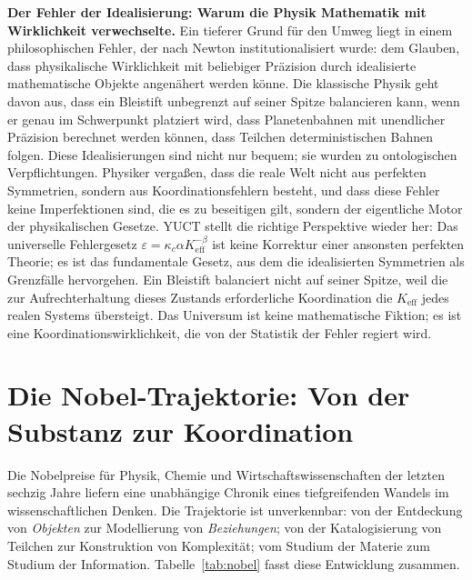 \documentclass[12pt,a4paper]{article}
\begin{document}
	\textbf{Der Fehler der Idealisierung: Warum die Physik Mathematik mit Wirklichkeit verwechselte.} Ein tieferer Grund für den Umweg liegt in einem philosophischen Fehler, der nach Newton institutionalisiert wurde: dem Glauben, dass physikalische Wirklichkeit mit beliebiger Präzision durch idealisierte mathematische Objekte angenähert werden könne. Die klassische Physik geht davon aus, dass ein Bleistift unbegrenzt auf seiner Spitze balancieren kann, wenn er genau im Schwerpunkt platziert wird, dass Planetenbahnen mit unendlicher Präzision berechnet werden können, dass Teilchen deterministischen Bahnen folgen. Diese Idealisierungen sind nicht nur bequem; sie wurden zu ontologischen Verpflichtungen. Physiker vergaßen, dass die reale Welt nicht aus perfekten Symmetrien, sondern aus Koordinationsfehlern besteht, und dass diese Fehler keine Imperfektionen sind, die es zu beseitigen gilt, sondern der eigentliche Motor der physikalischen Gesetze. YUCT stellt die richtige Perspektive wieder her: Das universelle Fehlergesetz \(\varepsilon = \kappa_c \alpha K_{\mathrm{eff}}^{-\beta}\) ist keine Korrektur einer ansonsten perfekten Theorie; es ist das fundamentale Gesetz, aus dem die idealisierten Symmetrien als Grenzfälle hervorgehen. Ein Bleistift balanciert nicht auf seiner Spitze, weil die zur Aufrechterhaltung dieses Zustands erforderliche Koordination die \(K_{\mathrm{eff}}\) jedes realen Systems übersteigt. Das Universum ist keine mathematische Fiktion; es ist eine Koordinationswirklichkeit, die von der Statistik der Fehler regiert wird.
	
	\section{Die Nobel-Trajektorie: Von der Substanz zur Koordination}
	
	Die Nobelpreise für Physik, Chemie und Wirtschaftswissenschaften der letzten sechzig Jahre liefern eine unabhängige Chronik eines tiefgreifenden Wandels im wissenschaftlichen Denken. Die Trajektorie ist unverkennbar: von der Entdeckung von \emph{Objekten} zur Modellierung von \emph{Beziehungen}; von der Katalogisierung von Teilchen zur Konstruktion von Komplexität; vom Studium der Materie zum Studium der Information. Tabelle~\ref{tab:nobel} fasst diese Entwicklung zusammen.
	
\end{document}
